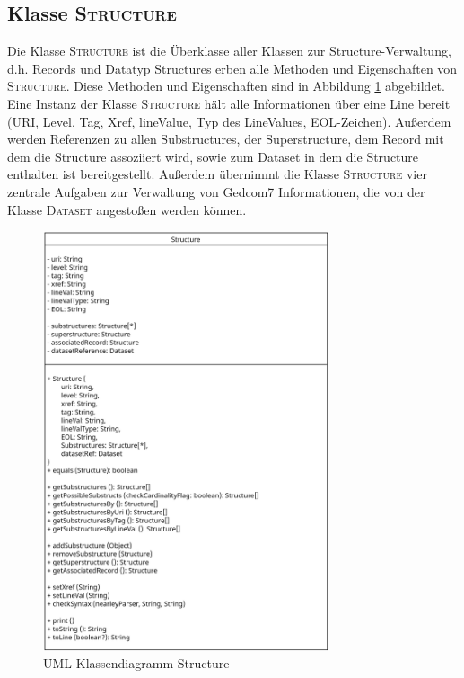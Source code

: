 \subsection{Klasse \textsc{Structure}}
\label{subsec: Implementierung - Gedcom Struktur - Klasse Structure}
Die Klasse \textsc{Structure} ist die Überklasse aller Klassen zur Structure-Verwaltung, d.h. Records und Datatyp Structures erben alle Methoden und Eigenschaften von \textsc{Structure}. Diese Methoden und Eigenschaften sind in Abbildung \ref{fig: UML Klassendiagramm Structure} abgebildet. Eine Instanz der Klasse \textsc{Structure} hält alle Informationen über eine Line bereit (URI, Level, Tag, Xref, lineValue, Typ des LineValues, EOL-Zeichen). Außerdem werden Referenzen zu allen Substructures, der Superstructure, dem Record mit dem die Structure assoziiert wird, sowie zum Dataset in dem die Structure enthalten ist bereitgestellt. Außerdem übernimmt die Klasse \textsc{Structure} vier zentrale Aufgaben zur Verwaltung von Gedcom7 Informationen, die von der Klasse \textsc{Dataset} angestoßen werden können.

\begin{figure}[h]
	\centering
	\includegraphics[width=0.75\textwidth]{images/UML_Class_Structure.png}
	\caption{UML Klassendiagramm Structure}
	\label{fig: UML Klassendiagramm Structure}
\end{figure}

